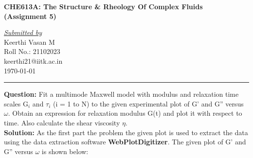 \documentclass[a4paper,12pt]{report}
\begin{document}
\begin{center}
    \large \textbf{CHE613A: The Structure \& Rheology Of Complex Fluids\\(Assignment 5)}
\end{center}

\begin{flushright}
    \textit{\underline{Submitted by}}\\Keerthi Vasan M\\Roll No.: 21102023\\keerthi21@iitk.ac.in\\ \today
\end{flushright}
\vspace{-5mm}
\rule{\textwidth}{0.5 pt}
\noindent
\textbf{Question: }Fit a multimode Maxwell model with modulus and relaxation time scales G$_i$ and $\tau_i$ (i = 1 to N) to the given experimental plot of G' and G'' versus $\omega$. Obtain an expression for relaxation modulus G(t) and plot it with respect to time. Also calculate the shear viscosity $\eta$.\\[0.4 cm]
\textbf{Solution:} As the first part the problem the given plot is used to extract the data using the data extraction software \textbf{WebPlotDigitizer}. The given plot of G' and G'' versus $\omega$ is shown below:
\end{document}
